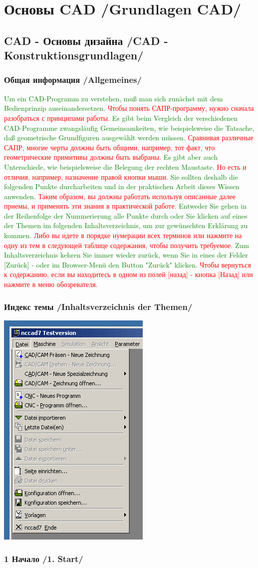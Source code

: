 \documentclass[14pt,a4paper]{book}
\newcommand{\keys}[1]{[#1]}
\newcommand{\DE}[1]{\textcolor{green}{#1}}
\newcommand{\RU}[1]{\textcolor{red}{#1}}
\newcommand{\TRchapter}[2]{\chapter{#2 /#1/}}
\newcommand{\TRsection}[2]{\section{#2 /#1/}}
\newcommand{\TRsubsection}[2]{\subsection{#2 /#1/}}
\begin{document}
\TRchapter{Grundlagen CAD}{Основы CAD}
	\TRsection{CAD - Konstruktionsgrundlagen}{CAD - Основы дизайна}

\TRsubsection{Allgemeines}{Общая информация}

\DE{Um ein CAD-Programm zu verstehen, muß man sich zunächst mit dem
Bedienprinzip auseinandersetzen.}
\RU{Чтобы понять САПР-программу, нужно сначала разобраться с принципами работы.}
\DE{Es gibt beim Vergleich der verschiedenen
CAD-Programme zwangsläufig Gemeinsamkeiten, wie beispielsweise die Tatsache, 
daß geometrische 
Grundfiguren ausgewählt werden müssen.}
\RU{Сравнивая различные САПР, многие черты должны быть общими, например, тот
факт, что геометрические примитивы должны быть выбраны.}
\DE{Es gibt aber auch Unterschiede, wie 
beispielsweise die Belegung der rechten Maustaste.}
\RU{Но есть и отличия, например, назначение правой кнопки мыши.}
\DE{Sie sollten deshalb die folgenden Punkte durcharbeiten und in der praktischen 
Arbeit dieses Wissen anwenden.} 
\RU{Таким образом, вы должны работать используя описанные далее приемы, и
применять эти знания в практической работе.}
\DE{Entweder Sie gehen in der Reihenfolge der Nummerierung alle Punkte durch
oder Sie klicken auf eines der Themen im folgenden Inhaltsverzeichnis, um zur 
gewünschten Erklärung zu kommen.}
\RU{Либо вы идете в порядке нумерации всех терминов или нажмите на одну из тем в
следующей таблице содержания, чтобы получить требуемое.}
\DE{Zum Inhaltsverzeichnis kehren Sie immer wieder zurück, wenn Sie in eines der 
Felder [Zurück] - oder im Browser-Menü den Button "Zurück" klicken.}
\RU{Чтобы вернуться к содержанию, если вы находитесь в одном из полей
\keys{назад} - кнопка \keys{Назад} или нажмите в меню обозревателя.}

\TRsubsection{Inhaltsverzeichnis der Themen}{Индекс темы}

\includegraphics{pic/Kons1.png}
\TRsubsection{1. Start}{1 Начало}
\end{document}
